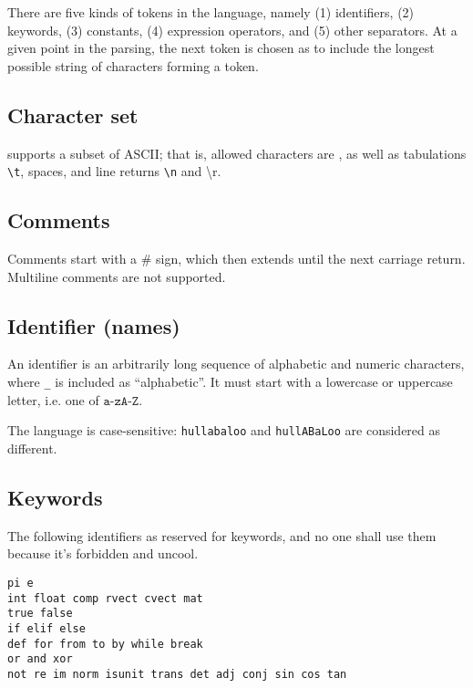 There are five kinds of tokens in the language, namely \textsf{(1)} identifiers, \textsf{(2)} keywords, \textsf{(3)} constants, \textsf{(4)} expression operators, and \textsf{(5)} other separators. At a given point in the parsing, the next token is chosen as to include the longest possible string of characters forming a token.

\subsection{Character set}
\QL supports a subset of ASCII; that is, allowed characters are
, as well as tabulations \texttt{\textbackslash{}t}, spaces, and line returns \texttt{\textbackslash{}n} and {\textbackslash{}r}.
\subsection{Comments}
Comments start with a \# sign, which then extends until the next carriage return. Multiline comments are not supported.

\subsection{Identifier (names)}
An identifier is an arbitrarily long sequence of alphabetic and numeric characters, where \texttt{\_} is included as ``alphabetic''. It must start with a lowercase or uppercase letter, i.e. one of $\texttt{a-zA-Z}$.

\noindent The language is case-sensitive: \texttt{hullabaloo} and \texttt{hullABaLoo} are considered as different.

\subsection{Keywords}
The following identifiers as reserved for keywords, and no one shall use them because it's forbidden and uncool.
\begin{verbatim}
pi e
int float comp rvect cvect mat
true false
if elif else
def for from to by while break
or and xor
not re im norm isunit trans det adj conj sin cos tan
\end{verbatim}
